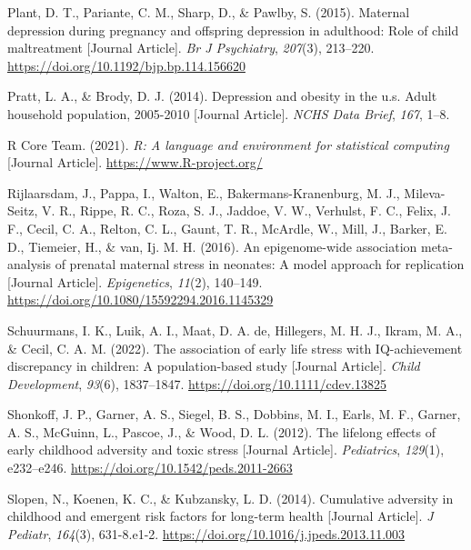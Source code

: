 \documentclass[
  letterpaper,
  DIV=11,
  numbers=noendperiod]{scrreport}
\newlength{\cslhangindent}
\newenvironment{CSLReferences}[2] %
 {\begin{list}{}{%
  \setlength{\itemindent}{0pt}
  \setlength{\leftmargin}{0pt}
  \setlength{\parsep}{0pt}
  \ifodd #1
   \setlength{\leftmargin}{\cslhangindent}
   \setlength{\itemindent}{-1\cslhangindent}
  \fi
  \setlength{\itemsep}{#2\baselineskip}}}
 {\end{list}}
\begin{document}
\begin{CSLReferences}{1}{0}
Plant, D. T., Pariante, C. M., Sharp, D., \& Pawlby, S. (2015). Maternal
depression during pregnancy and offspring depression in adulthood: Role
of child maltreatment {[}Journal Article{]}. \emph{Br J Psychiatry},
\emph{207}(3), 213--220. \url{https://doi.org/10.1192/bjp.bp.114.156620}

Pratt, L. A., \& Brody, D. J. (2014). Depression and obesity in the u.s.
Adult household population, 2005-2010 {[}Journal Article{]}. \emph{NCHS
Data Brief}, \emph{167}, 1--8.

R Core Team. (2021). \emph{R: A language and environment for statistical
computing} {[}Journal Article{]}. \url{https://www.R-project.org/}

Rijlaarsdam, J., Pappa, I., Walton, E., Bakermans-Kranenburg, M. J.,
Mileva-Seitz, V. R., Rippe, R. C., Roza, S. J., Jaddoe, V. W., Verhulst,
F. C., Felix, J. F., Cecil, C. A., Relton, C. L., Gaunt, T. R., McArdle,
W., Mill, J., Barker, E. D., Tiemeier, H., \& van, Ij. M. H. (2016). An
epigenome-wide association meta-analysis of prenatal maternal stress in
neonates: A model approach for replication {[}Journal Article{]}.
\emph{Epigenetics}, \emph{11}(2), 140--149.
\url{https://doi.org/10.1080/15592294.2016.1145329}

Schuurmans, I. K., Luik, A. I., Maat, D. A. de, Hillegers, M. H. J.,
Ikram, M. A., \& Cecil, C. A. M. (2022). The association of early life
stress with IQ-achievement discrepancy in children: A population-based
study {[}Journal Article{]}. \emph{Child Development}, \emph{93}(6),
1837--1847. \url{https://doi.org/10.1111/cdev.13825}

Shonkoff, J. P., Garner, A. S., Siegel, B. S., Dobbins, M. I., Earls, M.
F., Garner, A. S., McGuinn, L., Pascoe, J., \& Wood, D. L. (2012). The
lifelong effects of early childhood adversity and toxic stress
{[}Journal Article{]}. \emph{Pediatrics}, \emph{129}(1), e232--e246.
\url{https://doi.org/10.1542/peds.2011-2663}

Slopen, N., Koenen, K. C., \& Kubzansky, L. D. (2014). Cumulative
adversity in childhood and emergent risk factors for long-term health
{[}Journal Article{]}. \emph{J Pediatr}, \emph{164}(3), 631-8.e1-2.
\url{https://doi.org/10.1016/j.jpeds.2013.11.003}


\end{CSLReferences}
\end{document}
